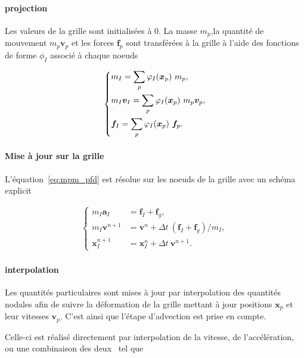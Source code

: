 \paragraph*{projection}

Les valeurs de la grille sont initialisées à 0. La masse $m_p$,la quantité de mouvement $m_p \bm v_p$ et les forces $\bm f_p$ sont transférées à la grille à l'aide des fonctions de forme $\phi_I$ associé à chaque noeuds

\begin{gather*}
    \left\{\begin{aligned}
         & m_I = \sum_p \varphi_{I}(\bm{x}_p)~ m_p,                   \\
         & m_I \bm v_I  =  \sum_p \varphi_{I}(\bm{x}_p)~ m_p \bm v_p, \\
         & \bm f_I  =  \sum_p \varphi_{I}(\bm{x}_p)~\bm f_p.
    \end{aligned} \right.
\end{gather*}

\paragraph*{Mise à jour sur la grille}

L'équation~\ref{eq:mpm_pfd} est résolue sur les noeuds de la grille avec un schéma explicit

\begin{gather*}
    \left\{\begin{aligned}
        m_I \bm a_I     & =  \bm f_I + \bm f_g,                               \\
        m_I \bm v^{n+1} & =  \bm v^{n} + \Delta t~ (\bm f_I + \bm f_g) / m_I, \\
        \bm x_I^{n+1}   & =  \bm x_I^{n} + \Delta t~\bm v^{n+1}.
    \end{aligned} \right.
\end{gather*}

\paragraph*{interpolation}

Les quantités particulaires sont mises à jour par interpolation des quantités nodales afin de suivre la déformation de la grille mettant à jour positions $\bm x_p$ et leur vitesses $\bm v_p$. C'est ainsi que l'étape d'advection est prise en compte.

Celle-ci est réalisé directement par interpolation de la vitesse, de l'accélération, ou une combinaison des deux~\cite{stomakhin2013material} tel que

